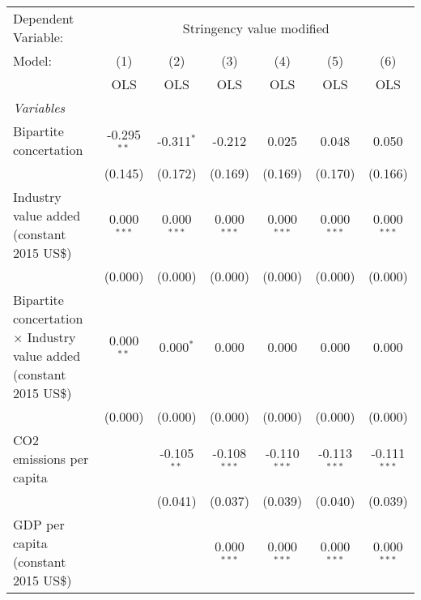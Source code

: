 
\begingroup
\centering
\begin{tabular}{lcccccc}
   \toprule
   Dependent Variable: & \multicolumn{6}{c}{Stringency value modified}\\
   Model:                                                                      & (1)           & (2)           & (3)            & (4)            & (5)            & (6)\\  
                                                                               &  OLS          & OLS           & OLS            & OLS            & OLS            & OLS\\  
   \midrule
   \emph{Variables}\\
   Bipartite concertation                                                      & -0.295$^{**}$ & -0.311$^{*}$  & -0.212         & 0.025          & 0.048          & 0.050\\   
                                                                               & (0.145)       & (0.172)       & (0.169)        & (0.169)        & (0.170)        & (0.166)\\   
   Industry value added (constant 2015 US\$)                                   & 0.000$^{***}$ & 0.000$^{***}$ & 0.000$^{***}$  & 0.000$^{***}$  & 0.000$^{***}$  & 0.000$^{***}$\\   
                                                                               & (0.000)       & (0.000)       & (0.000)        & (0.000)        & (0.000)        & (0.000)\\   
   Bipartite concertation $\times$ Industry value added (constant 2015 US\$)   & 0.000$^{**}$  & 0.000$^{*}$   & 0.000          & 0.000          & 0.000          & 0.000\\   
                                                                               & (0.000)       & (0.000)       & (0.000)        & (0.000)        & (0.000)        & (0.000)\\   
   CO2 emissions per capita                                                    &               & -0.105$^{**}$ & -0.108$^{***}$ & -0.110$^{***}$ & -0.113$^{***}$ & -0.111$^{***}$\\   
                                                                               &               & (0.041)       & (0.037)        & (0.039)        & (0.040)        & (0.039)\\   
   GDP per capita (constant 2015 US\$)                                         &               &               & 0.000$^{***}$  & 0.000$^{***}$  & 0.000$^{***}$  & 0.000$^{***}$\\   

\end{tabular}
